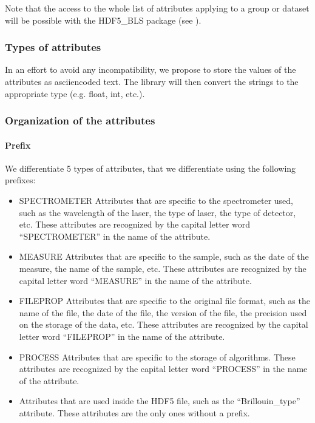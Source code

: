 \documentclass[letterpaper,10pt,english]{sphinxmanual}
\begin{document}
\sphinxAtStartPar
Note that the access to the whole list of attributes applying to a group or dataset will be possible with the HDF5\_BLS package (see ).


\subsubsection{Types of attributes}
\label{\detokenize{source/file_format:types-of-attributes}}
\sphinxAtStartPar
In an effort to avoid any incompatibility, we propose to store the values of the attributes as ascii\sphinxhyphen{}encoded text. The library will then convert the strings to the appropriate type (e.g. float, int, etc.).


\subsubsection{Organization of the attributes}
\label{\detokenize{source/file_format:organization-of-the-attributes}}

\paragraph{Prefix}
\label{\detokenize{source/file_format:prefix}}
\sphinxAtStartPar
We differentiate 5 types of attributes, that we differentiate using the following prefixes:
\begin{itemize}
\item {} 
\sphinxAtStartPar
SPECTROMETER \sphinxhyphen{} Attributes that are specific to the spectrometer used, such as the wavelength of the laser, the type of laser, the type of detector, etc. These attributes are recognized by the capital letter word “SPECTROMETER” in the name of the attribute.

\item {} 
\sphinxAtStartPar
MEASURE \sphinxhyphen{} Attributes that are specific to the sample, such as the date of the measure, the name of the sample, etc. These attributes are recognized by the capital letter word “MEASURE” in the name of the attribute.

\item {} 
\sphinxAtStartPar
FILEPROP \sphinxhyphen{} Attributes that are specific to the original file format, such as the name of the file, the date of the file, the version of the file, the precision used on the storage of the data, etc. These attributes are recognized by the capital letter word “FILEPROP” in the name of the attribute.

\item {} 
\sphinxAtStartPar
PROCESS \sphinxhyphen{} Attributes that are specific to the storage of algorithms. These attributes are recognized by the capital letter word “PROCESS” in the name of the attribute.

\item {} 
\sphinxAtStartPar
Attributes that are used inside the HDF5 file, such as the “Brillouin\_type” attribute. These attributes are the only ones without a prefix.

\end{itemize}
\end{document}
